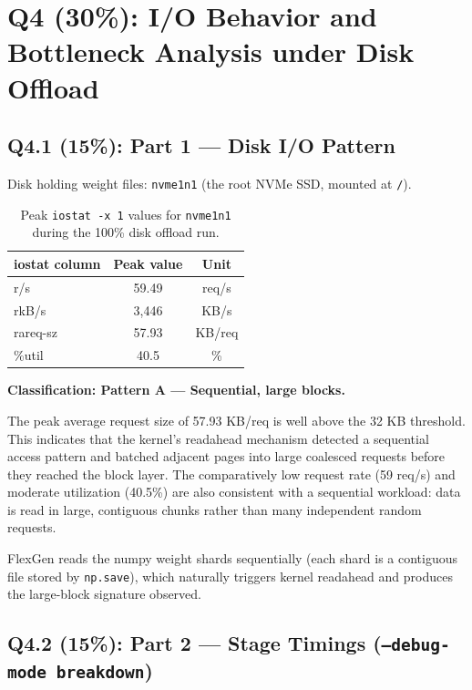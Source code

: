 \documentclass[12pt,a4paper]{article}
\begin{document}
\newpage

\section{Q4 (30\%): I/O Behavior and Bottleneck Analysis under Disk Offload}

\subsection*{Q4.1 (15\%): Part 1 --- Disk I/O Pattern}

Disk holding weight files: \texttt{nvme1n1} (the root NVMe SSD, mounted at \texttt{/}).

\begin{table}[H]
\centering
\caption{Peak \texttt{iostat -x 1} values for \texttt{nvme1n1} during the 100\% disk offload run.}
\begin{tabular}{lcc}
\toprule
\textbf{iostat column} & \textbf{Peak value} & \textbf{Unit} \\
\midrule
r/s       & 59.49    & req/s  \\
rkB/s     & 3{,}446  & KB/s   \\
rareq-sz  & 57.93    & KB/req \\
\%util    & 40.5     & \%     \\
\bottomrule
\end{tabular}
\end{table}

\textbf{Classification: Pattern A --- Sequential, large blocks.}

The peak average request size of 57.93 KB/req is well above the 32 KB threshold.
This indicates that the kernel's readahead mechanism detected a sequential access pattern and batched adjacent pages into large coalesced requests before they reached the block layer.
The comparatively low request rate (59 req/s) and moderate utilization (40.5\%) are also consistent with a sequential workload: data is read in large, contiguous chunks rather than many independent random requests.

FlexGen reads the numpy weight shards sequentially (each shard is a contiguous file stored by \texttt{np.save}), which naturally triggers kernel readahead and produces the large-block signature observed.

\subsection*{Q4.2 (15\%): Part 2 --- Stage Timings (\texttt{--debug-mode breakdown})}
\end{document}
